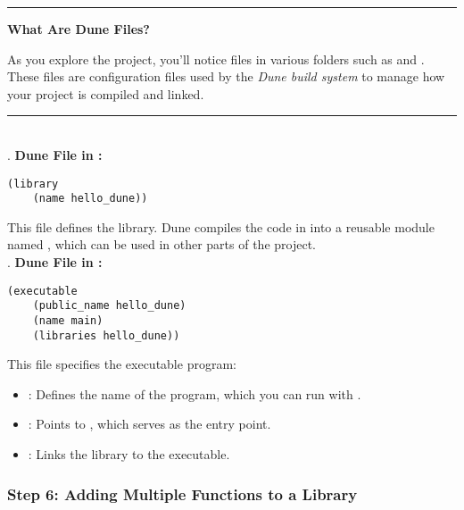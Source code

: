 \noindent
\rule{\textwidth}{0.4pt}

\vspace{.5em}
\noindent
\textbf{What Are Dune Files?}\\

\vspace{-.5em}

\noindent
As you explore the project, you'll notice  files in various folders such as  and . These files 
are configuration files used by the \textit{Dune build system} to manage how your project is compiled and linked.

\noindent
\rule{\textwidth}{0.4pt}\\

. \textbf{Dune File in :}
   \begin{lstlisting}[language=PlainText, caption={Library Dune File}]
   (library
    (name hello_dune))
   \end{lstlisting}

   \noindent This file defines the  library. Dune compiles the code in  into a reusable 
   module named , which can be used in other parts of the project.\\

. \textbf{Dune File in :}
   \begin{lstlisting}[language=PlainText, caption={Executable Dune File}]
   (executable
    (public_name hello_dune)
    (name main)
    (libraries hello_dune))
   \end{lstlisting}

   \noindent This file specifies the executable program:
   \begin{itemize}
       \item {}: Defines the name of the program, which you can run with .
       \item {}: Points to , which serves as the entry point.
       \item {}: Links the  library to the executable.
   \end{itemize}

\noindent

\newpage

\subsubsection{Step 6: Adding Multiple Functions to a Library}

